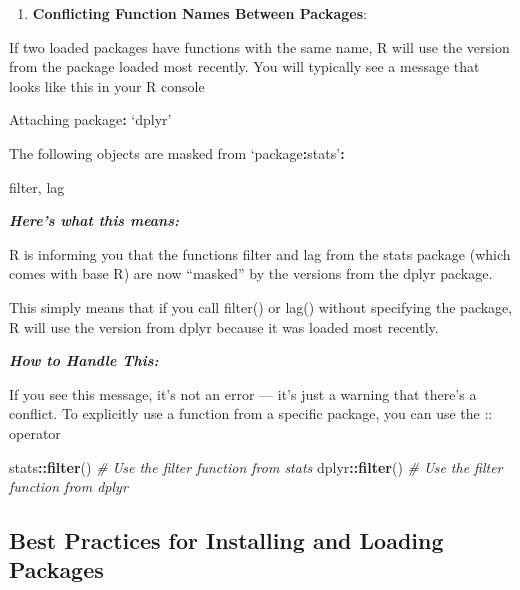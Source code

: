 \documentclass[
]{book}
\newenvironment{Shaded}{\begin{snugshade}}{\end{snugshade}}
\newcommand{\CommentTok}[1]{\textcolor[rgb]{0.56,0.35,0.01}{\textit{#1}}}
\newcommand{\FunctionTok}[1]{\textcolor[rgb]{0.13,0.29,0.53}{\textbf{#1}}}
\newcommand{\NormalTok}[1]{#1}
\newcommand{\SpecialCharTok}[1]{\textcolor[rgb]{0.81,0.36,0.00}{\textbf{#1}}}
\providecommand{\tightlist}{%
  \setlength{\itemsep}{0pt}\setlength{\parskip}{0pt}}
\begin{document}
\begin{enumerate}
\def\labelenumi{\arabic{enumi}.}
\setcounter{enumi}{3}
\tightlist
\item
  \textbf{Conflicting Function Names Between Packages}:
\end{enumerate}

If two loaded packages have functions with the same name, R will use the version from the package loaded most recently. You will typically see a message that looks like this in your R console

\begin{Shaded}
\begin{Highlighting}[]
\NormalTok{Attaching package}\SpecialCharTok{:}\NormalTok{ ‘dplyr’}

\NormalTok{The following objects are masked from ‘package}\SpecialCharTok{:}\NormalTok{stats’}\SpecialCharTok{:}

\NormalTok{    filter, lag}
\end{Highlighting}
\end{Shaded}

\textbf{\emph{Here's what this means:}}

R is informing you that the functions filter and lag from the stats package (which comes with base R) are now ``masked'' by the versions from the dplyr package.

This simply means that if you call filter() or lag() without specifying the package, R will use the version from dplyr because it was loaded most recently.

\textbf{\emph{How to Handle This:}}

If you see this message, it's not an error --- it's just a warning that there's a conflict. To explicitly use a function from a specific package, you can use the :: operator

\begin{Shaded}
\begin{Highlighting}[]
\NormalTok{stats}\SpecialCharTok{::}\FunctionTok{filter}\NormalTok{()  }\CommentTok{\# Use the filter function from stats}
\NormalTok{dplyr}\SpecialCharTok{::}\FunctionTok{filter}\NormalTok{()  }\CommentTok{\# Use the filter function from dplyr}
\end{Highlighting}
\end{Shaded}

\subsection{Best Practices for Installing and Loading Packages}\label{best-practices-for-installing-and-loading-packages}
\end{document}
